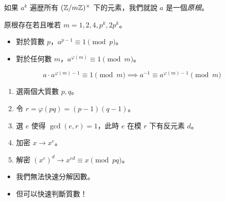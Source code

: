 \documentclass[standalone]{beamer}
\begin{document}
\begin{frame}{}

  \begin{definition}[原根]
    如果 $a^k$ 遍歴所有 $(\mathbb{Z} / m \mathbb{Z})^\times$ 下的元素，我們就說 $a$ 是一個\emph{原根}。
  \end{definition}
  \pause

  \begin{theorem}[原根存在的條件]
    原根存在若且唯若 $m = 1, 2, 4, p^k, 2p^k$。
  \end{theorem}
\end{frame}

\begin{frame}{}
  \begin{theorem}[Euler 定理]
    \begin{itemize}
      \item 對於質數 $p$，$a^{p-1} \equiv 1 \pmod{p}$。
      \item 對於任何數 $m$，$a^{\varphi(m)} \equiv 1 \pmod{m}$。
    \end{itemize}
  \end{theorem}
  \pause \disskip

  \[ a \cdot a^{\varphi(m) - 1} \equiv 1 \pmod{m} \implies a^{-1} \equiv a^{\varphi(m) - 1} \pmod{m} \]
\end{frame}

\begin{frame}{}
  \begin{enumerate}[<+->]
    \item \alert<7>{選兩個大質數 $p, q$}。
    \item \alert<6>{令 $r = \varphi(pq) = (p-1)(q-1)$}。
    \item 選 $e$ 使得 $\gcd(e, r) = 1$，此時 $e$ 在模 $r$ 下有反元素 $d$。
    \item 加密 $x \to x^e$。
    \item 解密 $(x^e)^d \to x^{ed} \equiv x \pmod{pq}$。
  \end{enumerate}

  \begin{itemize}[<+->]
    \item 我們無法快速分解因數。
    \item 但可以快速判斷質數！
  \end{itemize}
\end{frame}
\end{document}
